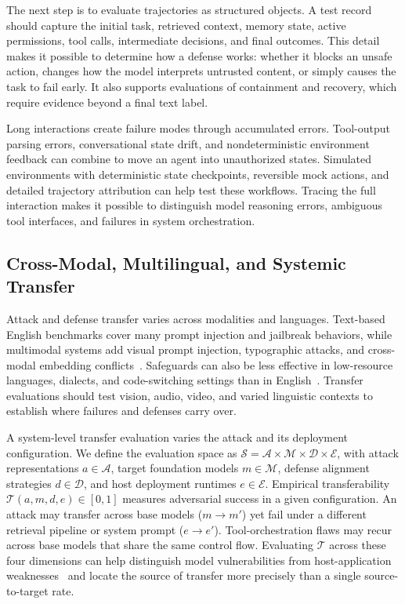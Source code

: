 \documentclass[review]{fcs}
\let\fcsOriginalCite\cite
\renewcommand{\cite}[1]{\allowbreak\fcsOriginalCite{#1}}
\begin{document}
The next step is to evaluate trajectories as structured objects. A test record should capture the initial task, retrieved context, memory state, active permissions, tool calls, intermediate decisions, and final outcomes. This detail makes it possible to determine how a defense works: whether it blocks an unsafe action, changes how the model interprets untrusted content, or simply causes the task to fail early. It also supports evaluations of containment and recovery, which require evidence beyond a final text label.

Long interactions create failure modes through accumulated errors. Tool-output parsing errors, conversational state drift, and nondeterministic environment feedback can combine to move an agent into unauthorized states. Simulated environments with deterministic state checkpoints, reversible mock actions, and detailed trajectory attribution can help test these workflows. Tracing the full interaction makes it possible to distinguish model reasoning errors, ambiguous tool interfaces, and failures in system orchestration.

\subsection{Cross-Modal, Multilingual, and Systemic Transfer}
\label{sec:agenda_transfer}

Attack and defense transfer varies across modalities and languages. Text-based English benchmarks cover many prompt injection and jailbreak behaviors, while multimodal systems add visual prompt injection, typographic attacks, and cross-modal embedding conflicts~\cite{liu2024mmsafetybench,ying2024safebench,liu2025videosafetybench}. Safeguards can also be less effective in low-resource languages, dialects, and code-switching settings than in English~\cite{deng2024multilingual,yong2023lowresource,rastogi2026goingplaces}. Transfer evaluations should test vision, audio, video, and varied linguistic contexts to establish where failures and defenses carry over.

A system-level transfer evaluation varies the attack and its deployment configuration. We define the evaluation space as $\mathcal{S} = \mathcal{A} \times \mathcal{M} \times \mathcal{D} \times \mathcal{E}$, with attack representations $a \in \mathcal{A}$, target foundation models $m \in \mathcal{M}$, defense alignment strategies $d \in \mathcal{D}$, and host deployment runtimes $e \in \mathcal{E}$. Empirical transferability $\mathcal{T}(a, m, d, e) \in [0, 1]$ measures adversarial success in a given configuration. An attack may transfer across base models ($m \to m'$) yet fail under a different retrieval pipeline or system prompt ($e \to e'$). Tool-orchestration flaws may recur across base models that share the same control flow. Evaluating $\mathcal{T}$ across these four dimensions can help distinguish model vulnerabilities from host-application weaknesses~\cite{liu2023houyi,wu2025darkfunction} and locate the source of transfer more precisely than a single source-to-target rate.
\end{document}
